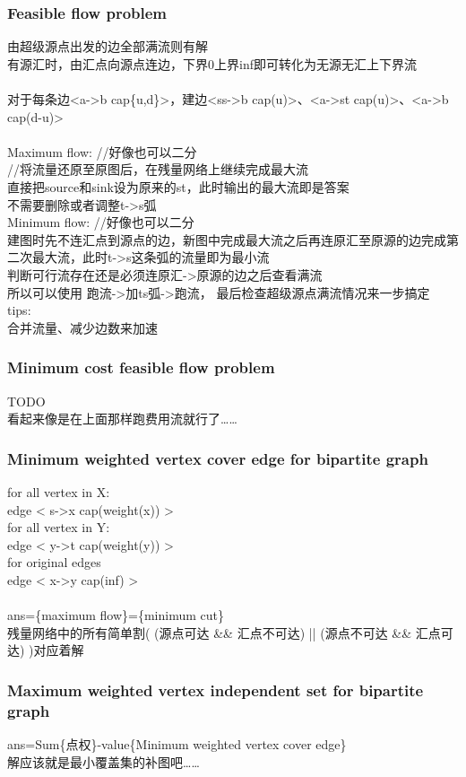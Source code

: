 \subsubsection{Feasible flow problem}
由超级源点出发的边全部满流则有解\\
有源汇时，由汇点向源点连边，下界0上界inf即可转化为无源无汇上下界流\\
\\
对于每条边<a->b cap\{u,d\}>，建边<ss->b cap(u)>、<a->st cap(u)>、<a->b cap(d-u)>\\
\\
Maximum flow: //好像也可以二分\\
//将流量还原至原图后，在残量网络上继续完成最大流\\
直接把source和sink设为原来的st，此时输出的最大流即是答案\\
不需要删除或者调整t->s弧\\
Minimum flow: //好像也可以二分\\
建图时先不连汇点到源点的边，新图中完成最大流之后再连原汇至原源的边完成第二次最大流，此时t->s这条弧的流量即为最小流\\
判断可行流存在还是必须连原汇->原源的边之后查看满流\\
所以可以使用 跑流->加ts弧->跑流， 最后检查超级源点满流情况来一步搞定\\
tips:\\
合并流量、减少边数来加速
\subsubsection{Minimum cost feasible flow problem}
TODO\\
看起来像是在上面那样跑费用流就行了……
\subsubsection{Minimum weighted vertex cover edge for bipartite graph}
for all vertex in X:\\
edge < s->x cap(weight(x)) >\\
for all vertex in Y:\\
edge < y->t cap(weight(y)) >\\
for original edges\\
edge < x->y cap(inf) >\\
\\
ans=\{maximum flow\}=\{minimum cut\}\\
残量网络中的所有简单割( (源点可达 \&\& 汇点不可达) || (源点不可达 \&\& 汇点可达) )对应着解
\subsubsection{Maximum weighted vertex independent set for bipartite graph}
ans=Sum\{点权\}-value\{Minimum weighted vertex cover edge\}\\
解应该就是最小覆盖集的补图吧……
